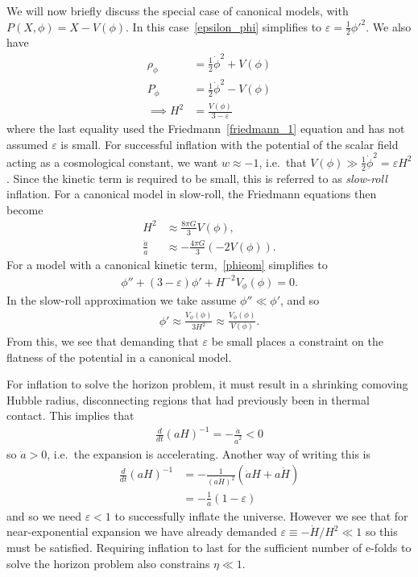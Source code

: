 We will now briefly discuss the special case of canonical models,
with $P(X,\phi)=X-V(\phi)$.
In this case~\eqref{epsilon_phi} simplifies to
$\varepsilon = \frac{1}{2}{\phi'}^2$.
    We also have
    \begin{align}
        \rho_\phi &= \frac{1}{2}\dot{\phi}^2+V(\phi)\\
        P_\phi &= \frac{1}{2}\dot{\phi}^2-V(\phi)\\
        \implies H^2 &= \frac{V(\phi)}{3-\varepsilon}
    \end{align}
    where the last equality used the Friedmann~\eqref{friedmann_1} equation and
    has not assumed $\varepsilon$ is small.
    For successful inflation with the potential of the scalar field acting as a
    cosmological constant, we want $w\approx-1$,
    i.e.\ that $V(\phi)\gg\frac{1}{2}\dot{\phi}^2=\varepsilon H^2$. Since the kinetic term is required to
    be small, this is referred to as \textit{slow-roll} inflation.
    For a canonical model in slow-roll,
    the Friedmann equations then become
    \begin{align}
        H^2 &\approx \frac{8\pi G}{3}V(\phi),\\
        \frac{\ddot{a}}{a} &\approx -\frac{4\pi G}{3}\left(-2V(\phi)\right).
    \end{align}
    For a model with a canonical kinetic term,~\eqref{phieom} simplifies to
    \begin{align}
        \phi''+(3-\varepsilon)\phi'+H^{-2}V_{\phi}(\phi)=0.
    \end{align}
    In the slow-roll approximation we take assume $\phi''\ll\phi'$,
    and so
    \begin{align}
        \phi'\approx\frac{V_{\phi}(\phi)}{3H^2}\approx\frac{V_{\phi}(\phi)}{V(\phi)}.
    \end{align}
    From this, we see that demanding that $\varepsilon$ be small places a constraint
    on the flatness of the potential in a canonical model.


    For inflation to solve the horizon problem, it must result in a shrinking comoving
    Hubble radius, disconnecting regions that had previously been in thermal contact.
    This implies that
    \begin{align}
        \frac{d}{dt}\left(aH\right)^{-1} = -\frac{\ddot{a}}{\dot{a}^2} < 0
    \end{align}
    so $\ddot{a}>0$, i.e.\ the expansion is accelerating. Another way of writing this is
    \begin{align}
        \frac{d}{dt}\left(aH\right)^{-1} &= -\frac{1}{(aH)^2}\left(\dot{a}H+a\dot{H}\right)\\
            &= -\frac{1}{a}\left(1-\varepsilon\right)
    \end{align}
    and so we need $\varepsilon<1$ to successfully inflate the universe.
    However we see that for near-exponential expansion we have already demanded
    $\varepsilon\equiv-\dot{H}/H^2\ll1$ so this must be satisfied.
    Requiring inflation to last for the sufficient number
    of e-folds to solve the horizon problem
    also constrains $\eta\ll1$.


